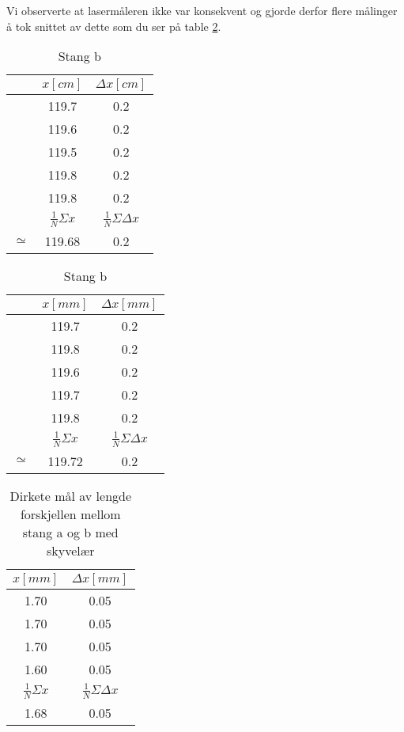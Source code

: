 \documentclass[norsk,a4paper,12pt]{article}
\begin{document}
Vi observerte at lasermåleren ikke var konsekvent og gjorde derfor flere målinger å tok snittet av dette som du ser på table \ref{laser}. 


\begin{table}
\caption{\textbf{Mål av stang a og stang b med lasermåler}}
	\begin{minipage}{.5\linewidth}
	\centering
	\caption{Stang a}
		\begin{tabular}{|c|c|c|}
		\hline
		&$x[cm]$ &$\Delta x [cm]$ \\ \hline
		&119.7 &0.2\\
		&119.6 &0.2\\
		&119.5 &0.2\\
		&119.8 &0.2\\
		&119.8 &0.2\\ \hline
		&$\frac{1}{N}\Sigma x$&$\frac{1}{N}\Sigma \Delta x$\\ \hline
		$\simeq$&119.68 & 0.2 \\ 
		\hline
		\end{tabular}
	\end{minipage}
	\begin{minipage}{.5\linewidth}
	\centering
	\caption{Stang b}
		\begin{tabular}{|c|c|c|}
		\hline
		&$x[mm]$ &$\Delta x [mm]$ \\ \hline
		&119.7 &0.2\\
		&119.8 &0.2\\
		&119.6 &0.2\\
		&119.7 &0.2\\
		&119.8&0.2\\ \hline
		&$\frac{1}{N}\Sigma x$&$\frac{1}{N}\Sigma \Delta x$\\ \hline
		$\simeq$&119.72 & 0.2\\ 
		\hline
		\end{tabular}
	\end{minipage}
\label{laser}
\end{table}

\begin{table}
\centering
\caption[Direkte avlesning av lengdeforskjell]{Dirkete mål av lengde forskjellen mellom stang a og b med skyvelær}
	\begin{tabular}{|c|c|}
	\hline
	$x[mm]$ & $\Delta x[mm]$ \\ 
	\hline
	1.70 & 0.05 \\
	1.70 & 0.05 \\
	1.70 & 0.05 \\
	1.60 & 0.05 \\ \hline
	$\frac{1}{N}\Sigma x$ &$\frac{1}{N}\Sigma \Delta x$\\
	\hline
	1.68 & 0.05 \\
	\hline
	\end{tabular}
\label{skyvelaer}
\end{table}
\end{document}
